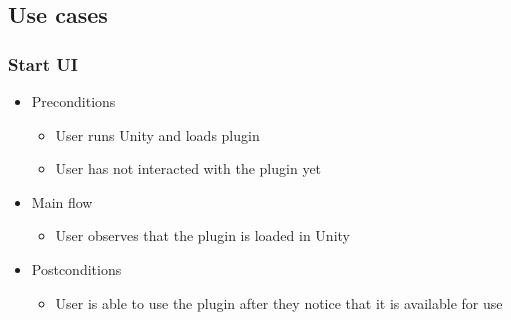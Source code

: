 \subsection{Use cases}
\subsubsection{Start UI}
    \begin{itemize}
    \item Preconditions
        \begin{itemize}
            \item User runs Unity and loads plugin
            \item User has not interacted with the plugin yet
        \end{itemize}
    \end{itemize}
    \begin{itemize}
        \item Main flow
        \begin{itemize}
            \item User observes that the plugin is loaded in Unity
        \end{itemize}
    \end{itemize}
    \begin{itemize}
        \item Postconditions
        \begin{itemize}
            \item User is able to use the plugin after they notice that it is available for use
        \end{itemize}
    \end{itemize}

